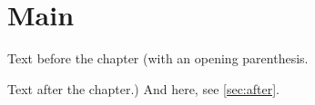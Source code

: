 \documentclass{article}
\begin{document}
\section{Main}
Text before the chapter (with an opening parenthesis.



Text after the chapter.) And \alsoundefined{} here, see \ref{sec:after}.
\end{document}
